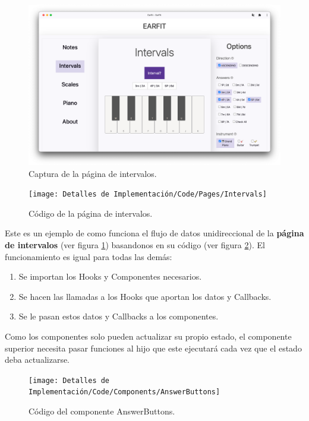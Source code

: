 \documentclass[12pt,twoside,titlepage]{report}
\begin{document}
\begin{figure}[H]
    \centering
    \includegraphics[width=\textwidth]{Capturas Earfit/PC/Intervals}
    \caption{Captura de la página de intervalos.}
    \label{fig:PCIntervals1}
\end{figure}

\begin{figure}[H]
    \centering
    \texttt{[image: Detalles de Implementación/Code/Pages/Intervals]}
    \caption{Código de la página de intervalos.}
    \label{fig:IntervalsPage}
\end{figure}

Este es un ejemplo de como funciona el flujo de datos unidireccional de la \textbf{página de intervalos} (ver figura \ref{fig:PCIntervals1}) basandonos en su código (ver figura \ref{fig:IntervalsPage}). El funcionamiento es igual para todas las demás: 

\begin{enumerate}
    \item  Se importan los Hooks y Componentes necesarios.
    \item  Se hacen las llamadas a los Hooks que aportan los datos y Callbacks.
    \item  Se le pasan estos datos y Callbacks a los componentes.
\end{enumerate}

Como los componentes solo pueden actualizar su propio estado, el componente superior necesita pasar funciones al hijo que este ejecutará cada vez que el estado deba actualizarse.

\begin{figure}[H]
    \centering
    \texttt{[image: Detalles de Implementación/Code/Components/AnswerButtons]}
    \caption{Código del componente AnswerButtons.}
    \label{fig:AnswerButtons}
\end{figure}
\end{document}
